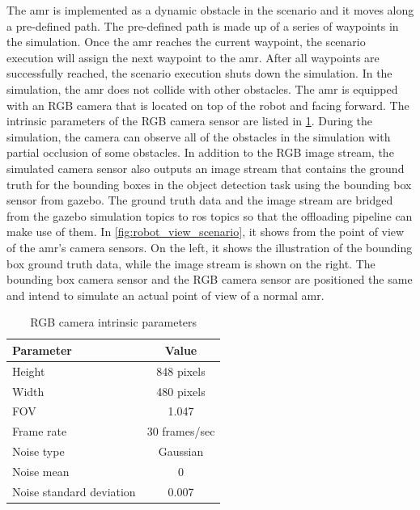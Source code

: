 The \gls{amr} is implemented as a dynamic obstacle in the scenario and it moves along a pre-defined path. The pre-defined path is made up of a series of waypoints in the simulation. Once the \gls{amr} reaches the current waypoint, the scenario execution will assign the next waypoint to the \gls{amr}. After all waypoints are successfully reached, the scenario execution shuts down the simulation. In the simulation, the \gls{amr} does not collide with other obstacles. The \gls{amr} is equipped with an RGB camera that is located on top of the robot and facing forward. The intrinsic parameters of the RGB camera sensor are listed in \cref{tab:camera_params}. During the simulation, the camera can observe all of the obstacles in the simulation with partial occlusion of some obstacles. In addition to the RGB image stream, the simulated camera sensor also outputs an image stream that contains the ground truth for the bounding boxes in the object detection task using the bounding box sensor from \gls{gazebo}. The ground truth data and the image stream are bridged from the \gls{gazebo} simulation topics to \gls{ros} topics so that the offloading pipeline can make use of them. In \cref{fig:robot_view_scenario}, it shows from the point of view of the \gls{amr}'s camera sensors. On the left, it shows the illustration of the bounding box ground truth data, while the image stream is shown on the right. The bounding box camera sensor and the RGB camera sensor are positioned the same and intend to simulate an actual point of view of a normal \gls{amr}.

\begin{table}[htp]
    \centering
    \begin{tabular}{lc}
    \toprule
    Parameter&                  Value\\
    \midrule
    Height&                     848 pixels\\
    Width&                      480 pixels\\
    FOV&                        1.047\\
    Frame rate&                 30 frames/sec\\
    Noise type&                 Gaussian\\
    Noise mean&                 0\\
    Noise standard deviation&   0.007\\
    \bottomrule
    \end{tabular}
    \caption{RGB camera intrinsic parameters}
    \label{tab:camera_params}
\end{table}


